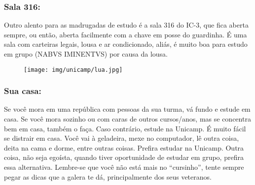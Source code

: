 \subsubsection{Sala 316:} Outro alento para as madrugadas de estudo é a sala 316
do IC-3, que fica aberta sempre, ou então, aberta facilmente com a chave em
posse do guardinha. É uma sala com carteiras legais, lousa e ar condicionado,
aliás, é muito boa para estudo em grupo (NABVS IMINENTVS) por causa da lousa.

\begin{figure}[h!]  \centering
  \texttt{[image: img/unicamp/lua.jpg]}
\end{figure}

\subsubsection{Sua casa:} Se você mora em uma república com pessoas da sua
turma, vá fundo e estude em casa. Se você mora sozinho ou com caras de outros
cursos/anos, mas se concentra bem em casa, também o faça. Caso contrário, estude
na Unicamp. É muito fácil se distrair em casa. Você vai à geladeira, mexe no
computador, lê outra coisa, deita na cama e dorme, entre outras coisas. Prefira
estudar na Unicamp. Outra coisa, não seja egoísta, quando tiver oportunidade de
estudar em grupo, prefira essa alternativa. Lembre-se que você não está mais no
``cursinho'', tente sempre pegar as dicas que a galera te dá, principalmente dos
seus veteranos.

